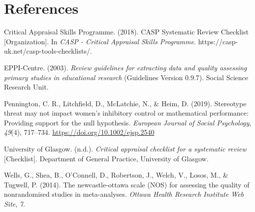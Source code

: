 \documentclass[
  doc, a4paper]{apa7}
\newlength{\cslhangindent}
\newenvironment{CSLReferences}[2] %
 {\begin{list}{}{%
  \setlength{\itemindent}{0pt}
  \setlength{\leftmargin}{0pt}
  \setlength{\parsep}{0pt}
  \ifodd #1
   \setlength{\leftmargin}{\cslhangindent}
   \setlength{\itemindent}{-1\cslhangindent}
  \fi
  \setlength{\itemsep}{#2\baselineskip}}}
 {\end{list}}
\begin{document}
\section{References}\label{references}

\label{refs}
\begin{CSLReferences}{1}{0}
Critical Appraisal Skills Programme. (2018). {CASP Systematic Review Checklist} {[}Organization{]}. In \emph{CASP - Critical Appraisal Skills Programme}. https://casp-uk.net/casp-tools-checklists/.

EPPI-Centre. (2003). \emph{Review guidelines for extracting data and quality assessing primary studies in educational research} (Guidelines Version 0.9.7). Social Science Research Unit.

Pennington, C. R., Litchfield, D., McLatchie, N., \& Heim, D. (2019). Stereotype threat may not impact women's inhibitory control or mathematical performance: {Providing} support for the null hypothesis. \emph{European Journal of Social Psychology}, \emph{49}(4), 717--734. \url{https://doi.org/10.1002/ejsp.2540}

University of Glasgow. (n.d.). \emph{Critical appraisal checklist for a systematic review} {[}Checklist{]}. Department of General Practice, University of Glasgow.

Wells, G., Shea, B., O'Connell, D., Robertson, J., Welch, V., Losos, M., \& Tugwell, P. (2014). The newcastle-ottawa scale ({NOS}) for assessing the quality of nonrandomised studies in meta-analyses. \emph{Ottawa Health Research Institute Web Site}, \emph{7}.

\end{CSLReferences}
\end{document}
